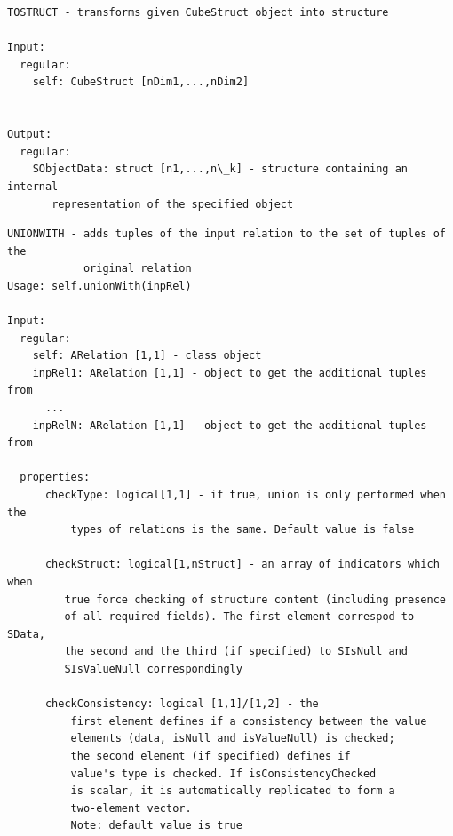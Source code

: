 \documentclass[letterpaper,10pt,english]{sphinxmanual}
\begin{document}
\begin{Verbatim}[commandchars=\\\{\}]
TOSTRUCT - transforms given CubeStruct object into structure

Input:
  regular:
    self: CubeStruct [nDim1,...,nDim2]


Output:
  regular:
    SObjectData: struct [n1,...,n\_k] - structure containing an internal
       representation of the specified object
\end{Verbatim}

\begin{Verbatim}[commandchars=\\\{\}]
UNIONWITH - adds tuples of the input relation to the set of tuples of the
            original relation
Usage: self.unionWith(inpRel)

Input:
  regular:
    self: ARelation [1,1] - class object
    inpRel1: ARelation [1,1] - object to get the additional tuples from
      ...
    inpRelN: ARelation [1,1] - object to get the additional tuples from

  properties:
      checkType: logical[1,1] - if true, union is only performed when the
          types of relations is the same. Default value is false

      checkStruct: logical[1,nStruct] - an array of indicators which when
         true force checking of structure content (including presence
         of all required fields). The first element correspod to SData,
         the second and the third (if specified) to SIsNull and
         SIsValueNull correspondingly

      checkConsistency: logical [1,1]/[1,2] - the
          first element defines if a consistency between the value
          elements (data, isNull and isValueNull) is checked;
          the second element (if specified) defines if
          value's type is checked. If isConsistencyChecked
          is scalar, it is automatically replicated to form a
          two-element vector.
          Note: default value is true
\end{Verbatim}
\end{document}
